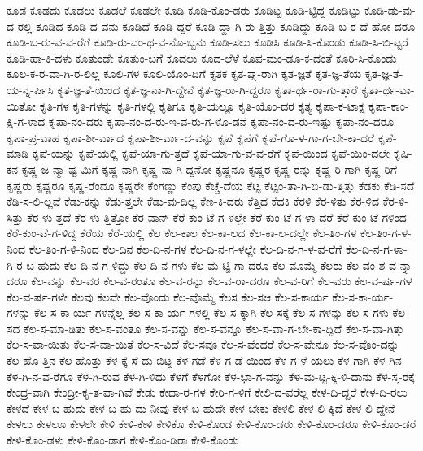 {ಕೂಡ
ಕೂಡದು
ಕೂಡಲು
ಕೂಡಲೆ
ಕೂಡಲೇ
ಕೂಡಿ
ಕೂಡಿ-ಕೊಂ-ಡರು
ಕೂಡಿಟ್ಟ
ಕೂಡಿ-ಟ್ಟಿದ್ದ
ಕೂಡಿಟ್ಟು
ಕೂಡಿ-ಡು-ವು-ದ-ರಲ್ಲಿ
ಕೂಡಿದ
ಕೂಡಿ-ದ-ವನು
ಕೂಡಿದೆ
ಕೂಡಿ-ದ್ದರೆ
ಕೂಡಿ-ದ್ದಾ-ಗಿ-ರು-ತ್ತಿತ್ತು
ಕೂಡಿದ್ದು
ಕೂಡಿ-ಬ-ರ-ದೆ-ಹೋ-ದರೂ
ಕೂಡಿ-ಬ-ರು-ವ-ವ-ರೆಗೆ
ಕೂಡಿ-ರು-ವಂ-ಥ-ವ-ನೊ-ಬ್ಬನು
ಕೂಡಿ-ಸಲು
ಕೂಡಿಸಿ
ಕೂಡಿ-ಸಿ-ಕೊಂಡು
ಕೂಡಿ-ಸಿ-ಬಿ-ಟ್ಟರೆ
ಕೂಡಿ-ಹಾ-ಕಿ-ದಳು
ಕೂತುಂಡೇ
ಕೂತುಂ-ಬಗೆ
ಕೂದಲು
ಕೂದ-ಲೆಳೆ
ಕೂಪ-ಮಂ-ಡೂ-ಕ-ದಂತೆ
ಕೂರಿ-ಸಿ-ಕೊಂಡು
ಕೂಲ-ಕ-ರ-ವಾ-ಗಿ-ರ-ಲಿಲ್ಲ
ಕೂಲಿ-ಗಳ
ಕೂಲಿ-ಯೊಂ-ದಿಗೆ
ಕೃತಕ
ಕೃತ-ಘ್ನ-ರಾಗಿ
ಕೃತ-ಜ್ಞತೆ
ಕೃತ-ಜ್ಞ-ತೆಯ
ಕೃತ-ಜ್ಞ-ತೆ-ಯ-ನ್ನ-ರ್ಪಿಸಿ
ಕೃತ-ಜ್ಞ-ತೆ-ಯಿಂದ
ಕೃತ-ಜ್ಞ-ನಾ-ಗಿ-ದ್ದೇನೆ
ಕೃತ-ಜ್ಞ-ರಾ-ಗಿ-ದ್ದರೂ
ಕೃತಾ-ರ್ಥ-ರಾ-ಗು-ತ್ತಾರೆ
ಕೃತಾ-ರ್ಥ-ವಾ-ಯಿತೋ
ಕೃತಿ-ಗಳ
ಕೃತಿ-ಗಳನ್ನು
ಕೃತಿ-ಗಳಲ್ಲಿ
ಕೃತಿಗೂ
ಕೃತಿ-ಯಲ್ಲೂ
ಕೃತಿ-ಯೊಂ-ದರ
ಕೃತ್ಯ
ಕೃಪಾ-ಕ-ಟಾಕ್ಷ
ಕೃಪಾ-ಕಾಂ-ಕ್ಷಿ-ಗ-ಳಾದ
ಕೃಪಾ-ನಂ-ದರು
ಕೃಪಾ-ನಂ-ದ-ರು-ಇ-ವ-ರು-ಗ-ಳೊ-ಡನೆ
ಕೃಪಾ-ನಂ-ದ-ರು-ಇಷ್ಟು
ಕೃಪಾ-ನಂ-ದರೂ
ಕೃಪಾ-ಪ್ರ-ವಾಹ
ಕೃಪಾ-ಶೀ-ರ್ವಾದ
ಕೃಪಾ-ಶೀ-ರ್ವಾ-ದ-ವನ್ನು
ಕೃಪೆ
ಕೃಪೆಗೆ
ಕೃಪೆ-ಗೊ-ಳ-ಗಾ-ಗ-ಬೇ-ಕಾ-ದರೆ
ಕೃಪೆ-ಮಾಡಿ
ಕೃಪೆ-ಯನ್ನು
ಕೃಪೆ-ಯಲ್ಲಿ
ಕೃಪೆ-ಯಾ-ಗು-ತ್ತದೆ
ಕೃಪೆ-ಯಾ-ಗು-ವ-ವ-ರೆಗೆ
ಕೃಪೆ-ಯಿಂದ
ಕೃಪೆ-ಯಿಂ-ದಲೇ
ಕೃಷಿ-ಕನ
ಕೃಷ್ಣ-ಜ-ನ್ಮಾ-ಷ್ಟ-ಮಿಗೆ
ಕೃಷ್ಣ-ನಾಗಿ
ಕೃಷ್ಣ-ನಾ-ಗಿ-ದ್ದನೋ
ಕೃಷ್ಣನೂ
ಕೃಷ್ಣರ
ಕೃಷ್ಣ-ರನ್ನು
ಕೃಷ್ಣ-ರಿ-ಗಾಗಿ
ಕೃಷ್ಣ-ರಿಗೆ
ಕೃಷ್ಣರು
ಕೃಷ್ಣರೂ
ಕೃಷ್ಣ-ರೆಂದೂ
ಕೃಷ್ಣರೇ
ಕೆಂಗಣ್ಣು
ಕೆಂಪು
ಕೆಚ್ಚೆ-ದೆಯ
ಕೆಟ್ಟ
ಕೆಟ್ಟಂ-ತಾ-ಗಿ-ಬಿ-ಡು-ತ್ತಿತ್ತು
ಕೆಡಕು
ಕೆಡಿ-ಸದೆ
ಕೆಡಿ-ಸ-ಲಿ-ಲ್ಲವೆ
ಕೆಡು-ಕನ್ನು
ಕೆಡು-ತ್ತಲೇ
ಕೆಡು-ವು-ದಿಲ್ಲ
ಕೆಣ-ಕಿ-ದರು
ಕೆತ್ತಿದ
ಕೆದಕಿ
ಕೆರಳಿ
ಕೆರ-ಳಿತು
ಕೆರ-ಳಿದ
ಕೆರ-ಳಿ-ಸಿತ್ತು
ಕೆರ-ಳು-ತ್ತದೆ
ಕೆರ-ಳು-ತ್ತಿತ್ತೋ
ಕೆರ-ವಾನ್
ಕೆರೆ-ಕುಂ-ಟೆ-ಗ-ಳಲ್ಲೇ
ಕೆರೆ-ಕುಂ-ಟೆ-ಗ-ಳಾ-ದರೆ
ಕೆರೆ-ಕುಂ-ಟೆ-ಗಳಿಂದ
ಕೆರೆ-ಕುಂ-ಟೆ-ಗ-ಳಿದ್ದ
ಕೆರೆಯ
ಕೆರೆ-ಯಲ್ಲಿ
ಕೆಲ
ಕೆಲ-ಕಾಲ
ಕೆಲ-ಕಾ-ಲದ
ಕೆಲ-ಕಾ-ಲ-ದಲ್ಲೇ
ಕೆಲ-ತಿಂ-ಗಳ
ಕೆಲ-ತಿಂ-ಗ-ಳ-ನಿಂದ
ಕೆಲ-ತಿಂ-ಗ-ಳಿ-ನಿಂದ
ಕೆಲ-ದಿನ
ಕೆಲ-ದಿ-ನ-ಗಳ
ಕೆಲ-ದಿ-ನ-ಗ-ಳಲ್ಲೇ
ಕೆಲ-ದಿ-ನ-ಗ-ಳ-ವ-ರೆಗೆ
ಕೆಲ-ದಿ-ನ-ಗ-ಳಾ-ಗಿ-ರ-ಬ-ಹುದು
ಕೆಲ-ದಿ-ನ-ಗ-ಳಿದ್ದು
ಕೆಲ-ದಿ-ನ-ಗಳು
ಕೆಲ-ಮ-ಟ್ಟಿ-ಗಾ-ದರೂ
ಕೆಲ-ಮೊಮ್ಮೆ
ಕೆಲರು
ಕೆಲ-ವಂ-ಶ-ವ-ನ್ನಾ-ದರೂ
ಕೆಲ-ವನ್ನು
ಕೆಲ-ವರ
ಕೆಲ-ವ-ರಂತೂ
ಕೆಲ-ವ-ರನ್ನು
ಕೆಲ-ವ-ರಾ-ದರೂ
ಕೆಲ-ವ-ರಿಗೆ
ಕೆಲ-ವರು
ಕೆಲ-ವ-ರ್ಷ-ಗಳ
ಕೆಲ-ವ-ರ್ಷ-ಗಳೇ
ಕೆಲವು
ಕೆಲವೇ
ಕೆಲ-ವೊಂದು
ಕೆಲ-ವೊಮ್ಮೆ
ಕೆಲಸ
ಕೆಲ-ಸಆ
ಕೆಲ-ಸ-ಕಾರ್ಯ
ಕೆಲ-ಸ-ಕಾ-ರ್ಯ-ಗಳನ್ನು
ಕೆಲ-ಸ-ಕಾ-ರ್ಯ-ಗಳನ್ನೆಲ್ಲ
ಕೆಲ-ಸ-ಕಾ-ರ್ಯ-ಗಳಲ್ಲಿ
ಕೆಲ-ಸ-ಕ್ಕಾಗಿ
ಕೆಲ-ಸಕ್ಕೆ
ಕೆಲ-ಸ-ಗಳನ್ನು
ಕೆಲ-ಸ-ಗಳು
ಕೆಲ-ಸದ
ಕೆಲ-ಸ-ಮಾ-ಡಿತು
ಕೆಲ-ಸ-ವಂತೂ
ಕೆಲ-ಸ-ವನ್ನು
ಕೆಲ-ಸ-ವನ್ನೂ
ಕೆಲ-ಸ-ವಾ-ಗ-ಬೇ-ಕಾ-ದ್ದಿದೆ
ಕೆಲ-ಸ-ವಾ-ಗಿತ್ತು
ಕೆಲ-ಸ-ವಾ-ಯಿತು
ಕೆಲ-ಸ-ವಾ-ಯಿತೆ
ಕೆಲ-ಸ-ವಿದೆ
ಕೆಲ-ಸವೂ
ಕೆಲ-ಸ-ವೆಂದರೆ
ಕೆಲ-ಸ-ವೇನೂ
ಕೆಲ-ಸ-ವೊಂ-ದನ್ನು
ಕೆಲ-ಹೊ-ತ್ತಿನ
ಕೆಲ-ಹೊತ್ತು
ಕೆಳ-ಕ್ಕೆ-ಸೆ-ದು-ಬಿಟ್ಟ
ಕೆಳ-ಗಡೆ
ಕೆಳ-ಗ-ಡೆ-ಯಿಂದ
ಕೆಳ-ಗ-ಳೆ-ಯಲು
ಕೆಳ-ಗಾಗಿ
ಕೆಳ-ಗಿನ
ಕೆಳ-ಗಿ-ನ-ವ-ರೆಗೂ
ಕೆಳ-ಗಿ-ರುವ
ಕೆಳ-ಗಿ-ಳಿದು
ಕೆಳಗೆ
ಕೆಳಗೋ
ಕೆಳ-ಭಾ-ಗ-ವನ್ನು
ಕೆಳ-ಮ-ಟ್ಟ-ಕ್ಕಿ-ಳಿ-ದಾನು
ಕೆಳ-ಸ್ತ-ರಕ್ಕೆ
ಕೇಂದ್ರ-ವಾಗಿ
ಕೇಂದ್ರೀ-ಕೃ-ತ-ವಾ-ಗಿವೆ
ಕೇಡು
ಕೇದಾ-ರ-ಗಳ
ಕೇರಿ-ಗ-ಳಿಗೆ
ಕೇಲಿ-ದ-ವರೆಲ್ಲ
ಕೇಳ-ದಿ-ದ್ದರೆ
ಕೇಳ-ದಿ-ರಲು
ಕೇಳದೆ
ಕೇಳ-ಬ-ಹುದು
ಕೇಳ-ಬ-ಹು-ದು-ನೀವು
ಕೇಳ-ಬ-ಹುದೇ
ಕೇಳ-ಬೇಕು
ಕೇಳಲಿ
ಕೇಳ-ಲಿ-ಕ್ಕಿದೆ
ಕೇಳ-ಲಿ-ದ್ದೇನೆ
ಕೇಳಲು
ಕೇಳಲೂ
ಕೇಳಲೇ
ಕೇಳಿ
ಕೇಳಿ-ಕೇಳಿ
ಕೇಳಿಕೊ
ಕೇಳಿ-ಕೊಂಡ
ಕೇಳಿ-ಕೊಂ-ಡರು
ಕೇಳಿ-ಕೊಂ-ಡರೂ
ಕೇಳಿ-ಕೊಂ-ಡರೆ
ಕೇಳಿ-ಕೊಂ-ಡಳು
ಕೇಳಿ-ಕೊಂ-ಡಾಗ
ಕೇಳಿ-ಕೊಂ-ಡಿರಾ
ಕೇಳಿ-ಕೊಂಡು
}
